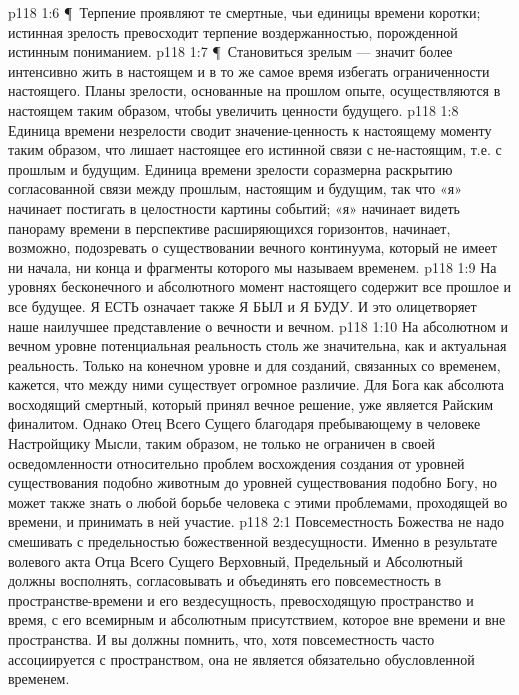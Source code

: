 \vs p118 1:6 \P\ Терпение проявляют те смертные, чьи единицы времени коротки; истинная зрелость превосходит терпение воздержанностью, порожденной истинным пониманием.
\vs p118 1:7 \P\ Становиться зрелым --- значит более интенсивно жить в настоящем и в то же самое время избегать ограниченности настоящего. Планы зрелости, основанные на прошлом опыте, осуществляются в настоящем таким образом, чтобы увеличить ценности будущего.
\vs p118 1:8 Единица времени незрелости сводит значение\hyp{}ценность к настоящему моменту таким образом, что лишает настоящее его истинной связи с не\hyp{}настоящим, т.е. с прошлым и будущим. Единица времени зрелости соразмерна раскрытию согласованной связи между прошлым, настоящим и будущим, так что «я» начинает постигать в целостности картины событий; «я» начинает видеть панораму времени в перспективе расширяющихся горизонтов, начинает, возможно, подозревать о существовании вечного континуума, который не имеет ни начала, ни конца и фрагменты которого мы называем временем.
\vs p118 1:9 На уровнях бесконечного и абсолютного момент настоящего содержит все прошлое и все будущее. Я ЕСТЬ означает также Я БЫЛ и Я БУДУ. И это олицетворяет наше наилучшее представление о вечности и вечном.
\vs p118 1:10 На абсолютном и вечном уровне потенциальная реальность столь же значительна, как и актуальная реальность. Только на конечном уровне и для созданий, связанных со временем, кажется, что между ними существует огромное различие. Для Бога как абсолюта восходящий смертный, который принял вечное решение, уже является Райским финалитом. Однако Отец Всего Сущего благодаря пребывающему в человеке Настройщику Мысли, таким образом, не только не ограничен в своей осведомленности относительно проблем восхождения создания от уровней существования подобно животным до уровней существования подобно Богу, но может также знать о любой борьбе человека с этими проблемами, проходящей во времени, и принимать в ней участие.
\vs p118 2:1 Повсеместность Божества не надо смешивать с предельностью божественной вездесущности. Именно в результате волевого акта Отца Всего Сущего Верховный, Предельный и Абсолютный должны восполнять, согласовывать и объединять его повсеместность в пространстве\hyp{}времени и его вездесущность, превосходящую пространство и время, с его всемирным и абсолютным присутствием, которое вне времени и вне пространства. И вы должны помнить, что, хотя повсеместность часто ассоциируется с пространством, она не является обязательно обусловленной временем.
